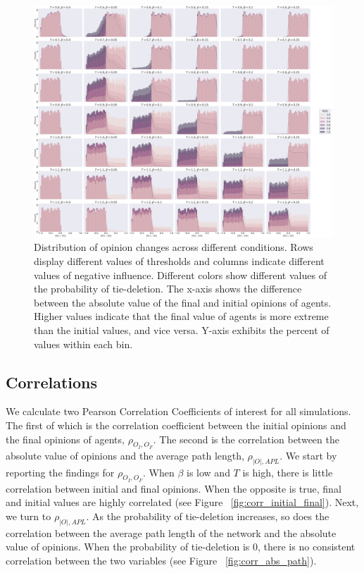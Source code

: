 \documentclass{article}
\begin{document}
\begin{figure}[H]
    \centering
    \includegraphics[width=.9\linewidth]{../plots/overall/Radicalization.png}
  \caption{Distribution of opinion changes across different conditions. Rows display different values of thresholds and columns indicate different values of negative influence. Different colors show different values of the probability of tie-deletion. The x-axis shows the difference between the absolute value of the final and initial opinions of agents. Higher values indicate that the final value of agents is more extreme than the initial values, and vice versa. Y-axis exhibits the percent of values within each bin. }
  \label{fig:radicalization}
\end{figure}

\subsection{Correlations}

We calculate two Pearson Correlation Coefficients of interest for all simulations. The first of which is the correlation coefficient between the initial opinions and the final opinions of agents, $\rho_{O_I, O_F}$. The second is the correlation between the absolute value of opinions and the average path length, $\rho_{|O|, APL}$.
We start by reporting the findings for $\rho_{O_I, O_F}$. When $\beta$ is low and $T$ is high, there is little correlation between initial and final opinions. When the opposite is true, final and initial values are highly correlated (see Figure ~\ref{fig:corr_initial_final}). 
Next, we turn to $\rho_{|O|, APL}$. As the probability of tie-deletion increases, so does the correlation between the average path length of the network and the absolute value of opinions. When the probability of tie-deletion is 0, there is no consistent correlation between the two variables (see Figure ~\ref{fig:corr_abs_path}). 
\end{document}
